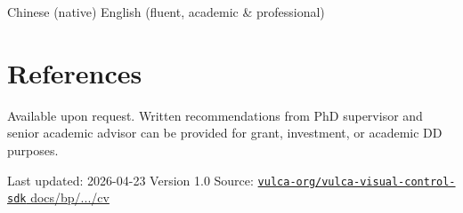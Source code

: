 \documentclass[10.5pt,a4paper]{article}
\begin{document}
Chinese (native) \textperiodcentered{} English (fluent, academic \& professional)

\section*{References}

Available upon request. Written recommendations from PhD supervisor and senior academic
advisor can be provided for grant, investment, or academic DD purposes.

\vspace{1cm}

\begin{center}
{\color{muted}\footnotesize
Last updated: 2026-04-23 \textperiodcentered{} Version 1.0 \textperiodcentered{} Source:
\href{https://github.com/vulca-org/vulca-visual-control-sdk/tree/master/docs/bp/2026-04-23-vulca-bp/cv}{\texttt{vulca-org/vulca-visual-control-sdk} \textperiodcentered{} docs/bp/.../cv}}
\end{center}
\end{document}
